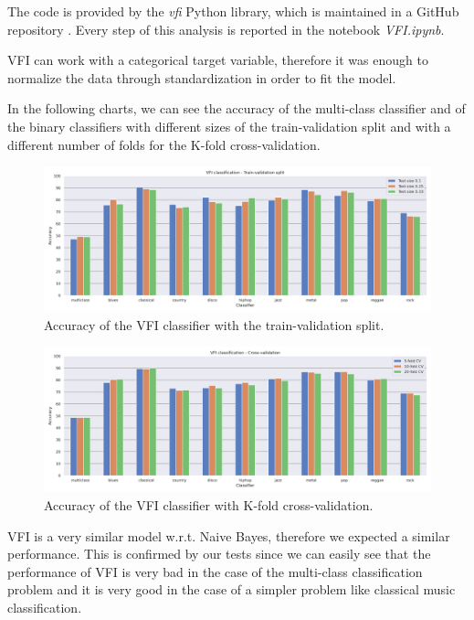 \documentclass{Configuration_Files/PoliMi3i_thesis}
\begin{document}
The code is provided by the \textit{vfi} Python library, which is maintained in a GitHub repository \cite{vfi}.
Every step of this analysis is reported in the notebook \textit{VFI.ipynb}.

VFI can work with a categorical target variable, therefore it was enough to normalize the data through standardization in order to fit the model. 

In the following charts, we can see the accuracy of the multi-class classifier and of the binary classifiers with different sizes of the train-validation split and with a different number of folds for the K-fold cross-validation.

\begin{figure}[H]
    \centering
    \includegraphics[width=\textwidth]{Figures/vfi_s.png}
    \caption{Accuracy of the VFI classifier with the train-validation split.}
    \label{fig:vfis}
\end{figure}

\begin{figure}[H]
    \centering
    \includegraphics[width=\textwidth]{Figures/vfi_d.png}
    \caption{Accuracy of the VFI classifier with K-fold cross-validation.}
    \label{fig:vfid}
\end{figure}

VFI is a very similar model w.r.t. Naive Bayes, therefore we expected a similar performance. 
This is confirmed by our tests since we can easily see that the performance of VFI is very bad in the case of the multi-class classification problem and it is very good in the case of a simpler problem like classical music classification.
\end{document}
